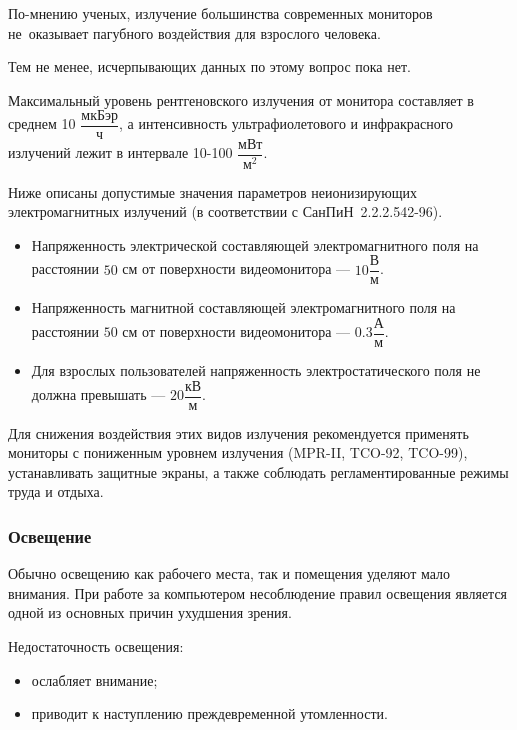 По-мнению ученых, излучение большинства современных мониторов 
не~оказывает пагубного воздействия для взрослого человека. 

Тем не менее, исчерпывающих данных по этому вопрос пока нет.

Максимальный уровень рентгеновского излучения от монитора составляет в среднем 10 $\dfrac{\text{мкБэр}}{\text{ч}}$, 
а интенсивность ультрафиолетового и инфракрасного излучений лежит в интервале 10-100 $\dfrac{\text{мВт}}{\text{м}^2}$.


Ниже описаны допустимые значения параметров
неионизирующих электромагнитных излучений 
(в соответствии с \mbox{СанПиН 2.2.2.542-96}).

\begin{itemize}
	\item  
		Напряженность электрической составляющей
		электромагнитного поля на расстоянии $50$ см от
		поверхности видеомонитора --- $10 \dfrac{\text{В}}{\text{м}}$.
	\item  
		Напряженность магнитной составляющей
		электромагнитного поля на расстоянии $50$ см от
		поверхности видеомонитора --- $0.3 \dfrac{\text{А}}{\text{м}}$.
	\item  
		Для взрослых пользователей напряженность 
		электростатического поля не должна превышать --- $20 \dfrac{\text{кВ}}{\text{м}}$.
\end{itemize}


Для снижения воздействия этих видов излучения рекомендуется применять
мониторы с пониженным уровнем излучения (MPR-II, TCO-92, TCO-99),
устанавливать защитные экраны, а также соблюдать регламентированные
режимы труда и отдыха.

\subsubsection{Освещение}

Обычно освещению как рабочего места, так и помещения уделяют мало внимания. 
При работе за компьютером несоблюдение правил освещения является
одной из основных причин ухудшения зрения. 

Недостаточность освещения:
\begin{itemize}
	\item  ослабляет внимание;
	\item  приводит к наступлению преждевременной утомленности.
\end{itemize}

